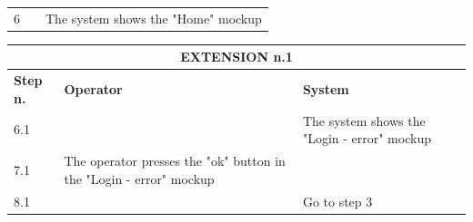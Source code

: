{{{\begin{table}[h]
\begin{tabular}{|p{1cm}|p{6cm}|p{6cm}|}
				\vspace{1mm} \vspace{1mm} \\
			\hline
				\vspace{1mm} 6 \vspace{1mm} &
				\vspace{1mm} \vspace{1mm} & 
				\vspace{1mm} The system shows the "Home" mockup\vspace{1mm} \\
			\hline
			\end{tabular}
			\end{table}
			\begin{table}[h]
			\begin{tabular}{|p{2cm}|p{6cm}|p{6cm}|}
			\hline
				\multicolumn{3}{|c|}{EXTENSION n.1} \\
			\hline
				\centering \vspace{1mm} \bfseries{Step n.} \vspace{1mm} & \vspace{1mm} \bfseries{Operator} \vspace{1mm} & \vspace{1mm} \bfseries{System} \vspace{1mm}\\
			\hline
				\vspace{1mm} 6.1 \vspace{1mm} &
				\vspace{1mm} \vspace{1mm} & 
				\vspace{1mm} The system shows the "Login - error" mockup\vspace{1mm} \\
			\hline
				\vspace{1mm} 7.1 \vspace{1mm} &
				\vspace{1mm} The operator presses the "ok" button in the "Login - error" mockup\vspace{1mm} & 
				\vspace{1mm} \vspace{1mm} \\
			\hline
				\vspace{1mm} 8.1 \vspace{1mm} &
				\vspace{1mm} \vspace{1mm} & 
				\vspace{1mm} Go to step 3 \vspace{1mm} \\
			\hline
			\end{tabular}
			\end{table}

}}}
